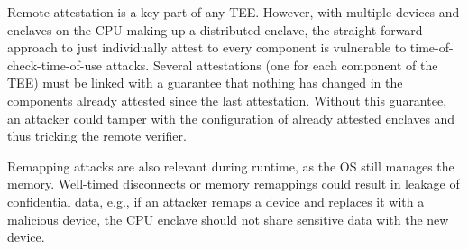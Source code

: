 Remote attestation is a key part of any TEE. However, with multiple \sphw devices and enclaves on the CPU making up a distributed enclave, the straight-forward approach to just individually attest to every component is vulnerable to time-of-check-time-of-use attacks. Several attestations (one for each component of the TEE) must be linked with a guarantee that nothing has changed in the components already attested since the last attestation. Without this guarantee, an attacker could tamper with the configuration of already attested enclaves and thus tricking the remote verifier.

Remapping attacks are also relevant during runtime, as the OS still manages the memory. Well-timed disconnects or memory remappings could result in leakage of confidential data, e.g., if an attacker remaps a \sphw device and replaces it with a malicious device, the CPU enclave should not share sensitive data with the new device. 

